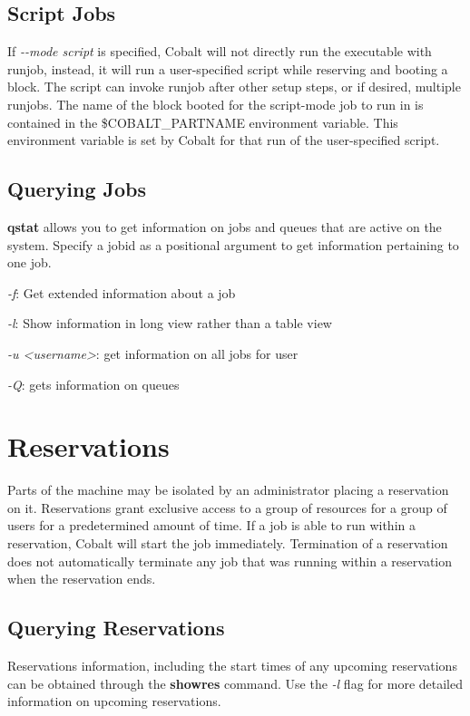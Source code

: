 \documentclass[12pt,letterpaper]{article}
\begin{document}
\subsection*{Script Jobs}
If \textit{-\--mode script} is specified, Cobalt will not directly run the executable with runjob, instead, it will run a user-specified script while reserving and booting a block.  The script can invoke runjob after other setup steps, or if desired, multiple runjobs. The name of the block booted for the script-mode job to run in is contained in the \$COBALT\_PARTNAME environment variable.  This environment variable is set by Cobalt for that run of the user-specified script.

\subsection*{Querying Jobs}
\textbf{qstat} allows you to get information on jobs and queues that are active on the system. Specify a jobid as a positional argument to get information pertaining to one job.

\begin{list}{}{}
\item \textit{-f}: Get extended information about a job
\item \textit{-l}: Show information in long view rather than a table view
\item \textit{-u \textless username\textgreater}: get information on all jobs for user
\item \textit{-Q}: gets information on queues
\end{list}

\section*{Reservations}
Parts of the machine may be isolated by an administrator placing a reservation on it.  Reservations grant exclusive access to a group of resources for a group of users for a predetermined amount of time.  If a job is able to run within a reservation, Cobalt will start the job immediately.  Termination of a reservation does not automatically terminate any job that was running within a reservation when the reservation ends.  

\subsection*{Querying Reservations}
Reservations information, including the start times of any upcoming reservations can be obtained through the \textbf{showres} command.  Use the \textit{-l} flag for more detailed information on upcoming reservations. 
\end{document}
